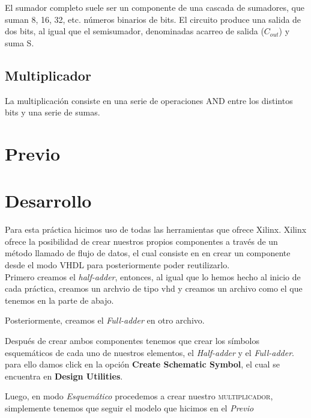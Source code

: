 \documentclass{mylib/reporteConCalif}
\begin{document}
 El sumador completo suele ser un componente de una cascada de sumadores, que suman 8, 16, 32, etc. números binarios de bits. El circuito produce una salida de dos bits, al igual que el semisumador, denominadas acarreo de salida ($C_{out}$) y suma S.

\subsection{Multiplicador}
La multiplicación consiste en una serie de operaciones AND entre los distintos bits y una serie de sumas.


\newpage
\section{Previo}

\newpage
\section{Desarrollo}

Para esta práctica hicimos uso de todas las herramientas que ofrece Xilinx. Xilinx ofrece la posibilidad de crear nuestros propios componentes a través de un método llamado de flujo de datos, el cual consiste en en crear un componente desde el modo VHDL para posteriormente poder reutilizarlo. \\

Primero creamos el \textit{half-adder}, entonces, al igual que lo hemos hecho al inicio de cada práctica, creamos un archvio de tipo vhd y creamos un archivo como el que tenemos en la parte de abajo.


Posteriormente, creamos el \textit{Full-adder} en otro archivo.


Después de crear ambos componentes tenemos que crear los símbolos esquemáticos de cada uno de nuestros elementos, el \textit{Half-adder} y el \textit{Full-adder}. para ello damos click en la opción \textbf{Create Schematic Symbol}, el cual se encuentra en \textbf{Design Utilities}.


Luego, en modo \textit{Esquemático} procedemos a crear nuestro \textsc{multiplicador}, simplemente tenemos que seguir el modelo que hicimos en el \textit{Previo}
\end{document}
